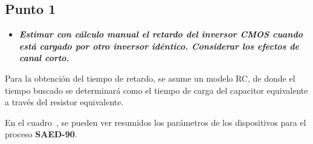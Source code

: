 
\subsection{Punto \textbf{1}}

\begin{itemize}
\item \emph{\textbf{Estimar con cálculo manual el retardo del inversor CMOS cuando está cargado por otro inversor idéntico. Considerar los efectos de canal corto.}}
\end{itemize}


Para la obtención del tiempo de retardo, se asume un modelo RC, de donde el tiempo buscado se determinará como el tiempo de carga del capacitor equivalente a través del resistor equivalente.



En el cuadro~, se pueden ver resumidos los parámetros de los dispositivos para el proceso \textbf{SAED-90}.



